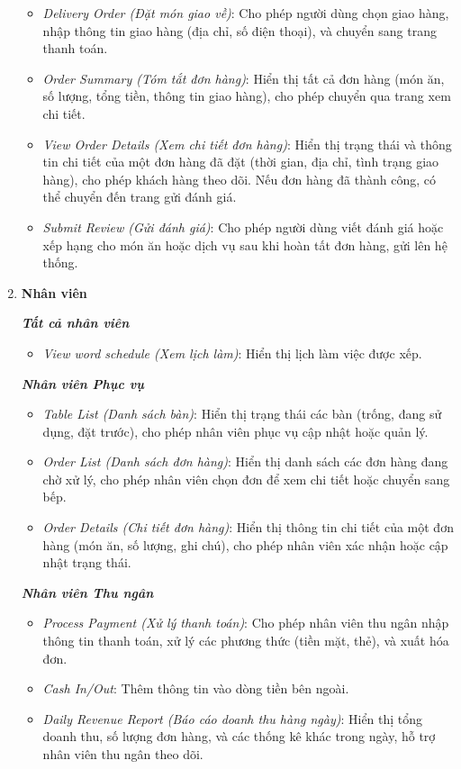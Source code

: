 \begin{enumerate}
\begin{itemize}
            \item \textit{Delivery Order (Đặt món giao về)}: Cho phép người dùng chọn giao hàng, nhập thông tin giao hàng (địa chỉ, số điện thoại), và chuyển sang trang thanh toán.
            \item \textit{Order Summary (Tóm tắt đơn hàng)}: Hiển thị tất cả đơn hàng (món ăn, số lượng, tổng tiền, thông tin giao hàng), cho phép chuyển qua trang xem chi tiết.
            \item \textit{View Order Details (Xem chi tiết đơn hàng)}: Hiển thị trạng thái và thông tin chi tiết của một đơn hàng đã đặt (thời gian, địa chỉ, tình trạng giao hàng), cho phép khách hàng theo dõi. Nếu đơn hàng đã thành công, có thể chuyển đến trang gửi đánh giá.
            \item \textit{Submit Review (Gửi đánh giá)}: Cho phép người dùng viết đánh giá hoặc xếp hạng cho món ăn hoặc dịch vụ sau khi hoàn tất đơn hàng, gửi lên hệ thống.
        \end{itemize}
    \item \textbf{Nhân viên}
    
        \textbf{\textit{Tất cả nhân viên}}
        \begin{itemize}
            \item \textit{View word schedule (Xem lịch làm)}: Hiển thị lịch làm việc được xếp.
        \end{itemize}
        \textbf{\textit{Nhân viên Phục vụ}}
        \begin{itemize}
            \item \textit{Table List (Danh sách bàn)}: Hiển thị trạng thái các bàn (trống, đang sử dụng, đặt trước), cho phép nhân viên phục vụ cập nhật hoặc quản lý.
            \item \textit{Order List (Danh sách đơn hàng)}: Hiển thị danh sách các đơn hàng đang chờ xử lý, cho phép nhân viên chọn đơn để xem chi tiết hoặc chuyển sang bếp.
            \item \textit{Order Details (Chi tiết đơn hàng)}: Hiển thị thông tin chi tiết của một đơn hàng (món ăn, số lượng, ghi chú), cho phép nhân viên xác nhận hoặc cập nhật trạng thái.
        \end{itemize}
            
        \textit{\textbf{Nhân viên Thu ngân}}
        \begin{itemize}
            \item \textit{Process Payment (Xử lý thanh toán)}: Cho phép nhân viên thu ngân nhập thông tin thanh toán, xử lý các phương thức (tiền mặt, thẻ), và xuất hóa đơn.
            \item \textit{Cash In/Out}: Thêm thông tin vào dòng tiền bên ngoài.
            \item \textit{Daily Revenue Report (Báo cáo doanh thu hàng ngày)}: Hiển thị tổng doanh thu, số lượng đơn hàng, và các thống kê khác trong ngày, hỗ trợ nhân viên thu ngân theo dõi.
        \end{itemize}
            

\end{enumerate}
